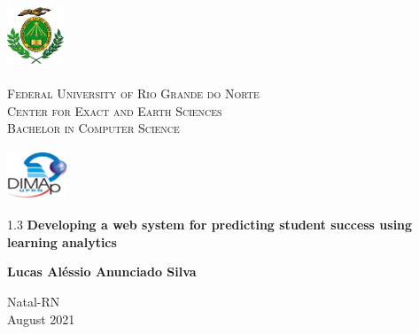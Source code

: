 
\begin{titlepage}
	\begin{center}
		
		\begin{minipage}{2cm}
			\begin{center}
				\includegraphics[width=1.7cm, height=2.0cm]{Imagens/Brasao-UFRN.jpg}
			\end{center}
		\end{minipage}
		\begin{minipage}{11cm}
			\begin{center}
				\begin{espacosimples}
					{\small \textsc{Federal University of Rio Grande do Norte}			\\
							  \textsc{Center for Exact and Earth Sciences}						\\
\textsc{Bachelor in Computer Science}}
				\end{espacosimples}
			\end{center}
		\end{minipage}
		\begin{minipage}{2cm}
			\begin{center}
				\includegraphics[width=1.8cm, height=1.5cm]{Imagens/Logotipo-DIMAp.jpg}
			\end{center}
		\end{minipage}
			
		\vspace{6cm}
						
		{\setlength{\baselineskip}%
		{1.3\baselineskip}
		{\LARGE \textbf{Developing a web system for predicting student success using learning analytics}}\par}
			
		\vspace{4cm}
			
		{\large \textbf{Lucas Aléssio Anunciado Silva}}
						
		\vspace{7cm}
		
		Natal-RN\\ August 2021
	\end{center}
\end{titlepage}
